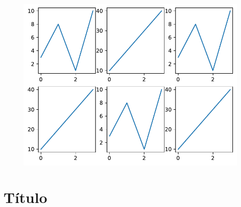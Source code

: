 \begin{code}
\begin{Shaded}
\begin{Highlighting}[]
\OperatorTok{=}\NormalTok{ np.array([}\NormalTok{, }\NormalTok{, }\NormalTok{, }\NormalTok{])}
\OperatorTok{=}\NormalTok{ np.array([}\NormalTok{, }\NormalTok{, }\NormalTok{, }\NormalTok{])}

\NormalTok{, }\NormalTok{, }\NormalTok{)}

\OperatorTok{=}\NormalTok{ np.array([}\NormalTok{, }\NormalTok{, }\NormalTok{, }\NormalTok{])}
\OperatorTok{=}\NormalTok{ np.array([}\NormalTok{, }\NormalTok{, }\NormalTok{, }\NormalTok{])}

\NormalTok{, }\NormalTok{, }\NormalTok{)}
\end{Highlighting}
\end{Shaded}

\begin{figure}
  \centering
  \includegraphics[scale=0.6]{img/grafica1033.pdf}
\end{figure}
\end{code}

\section{Título}

